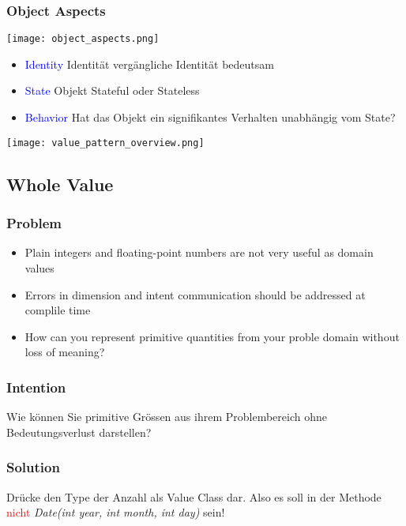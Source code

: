 \subsubsection{Object Aspects}
\texttt{[image: object\_aspects.png]}

\begin{itemize}
    \item \textcolor{blue}{Identity} Identität vergängliche Identität bedeutsam
    \item \textcolor{blue}{State} Objekt Stateful oder Stateless
    \item \textcolor{blue}{Behavior} Hat das Objekt ein signifikantes Verhalten unabhängig vom State?
\end{itemize}

\texttt{[image: value\_pattern\_overview.png]}

\subsection{Whole Value}
\subsubsection{Problem}
\begin{itemize}
    \item Plain integers and floating-point numbers are not very useful as domain values
    \item Errors in dimension and intent communication should be addressed at complile time
    \item How can you represent primitive quantities from your proble domain without loss of meaning?
\end{itemize}

\subsubsection{Intention}

Wie können Sie primitive Grössen aus ihrem Problembereich ohne Bedeutungsverlust darstellen?

\subsubsection{Solution}
Drücke den Type der Anzahl als Value Class dar. Also es soll in der Methode \textcolor{red}{nicht} \textit{Date(int year, int month, int day)} sein!\\

